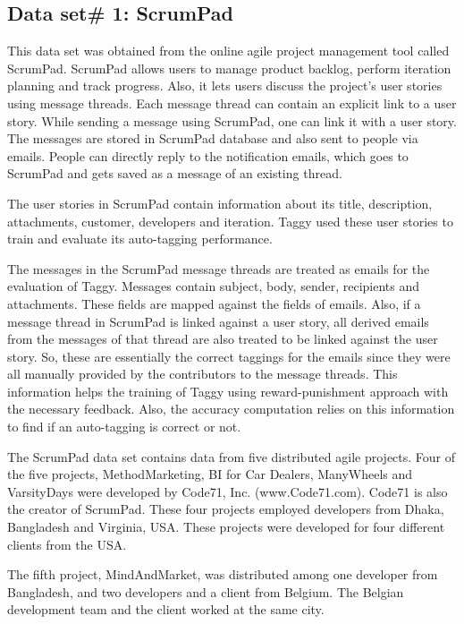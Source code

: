 \subsection{Data set\# 1: ScrumPad}	
This data set was obtained from the online agile project management tool called ScrumPad.	ScrumPad allows users to manage product backlog, perform iteration planning and track progress. Also, it lets users discuss the project's user stories using message threads. Each message thread can contain an explicit link to a user story. While sending a message using ScrumPad, one can link it with a user story. The messages are stored in ScrumPad database and also sent to people via emails. People can directly reply to the notification emails, which goes to ScrumPad and gets saved as a message of an existing thread.

The user stories in ScrumPad contain information about its title, description, attachments, customer, developers and iteration. Taggy used these user stories to train and evaluate its auto-tagging performance.

The messages in the ScrumPad message threads are treated as emails for the evaluation of Taggy. Messages contain subject, body, sender, recipients and attachments. These fields are mapped against the fields of emails. Also, if a message thread in ScrumPad is linked against a user story, all derived emails from the messages of that thread are also treated to be linked against the user story. So, these are essentially the correct taggings for the emails since they were all manually provided by the contributors to the message threads. This information helps the training of Taggy using reward-punishment approach with the necessary feedback. Also, the accuracy computation relies on this information to find if an auto-tagging is correct or not.

The ScrumPad data set contains data from five distributed agile projects. Four of the five projects, MethodMarketing, BI for Car Dealers, ManyWheels and VarsityDays were developed by Code71, Inc. (www.Code71.com). Code71 is also the creator of ScrumPad. These four projects employed developers from Dhaka, Bangladesh and Virginia, USA. These projects were developed for four different clients from the USA.

The fifth project, MindAndMarket, was distributed among one developer from Bangladesh, and two developers and a client from Belgium. The Belgian development team and the client worked at the same city.

